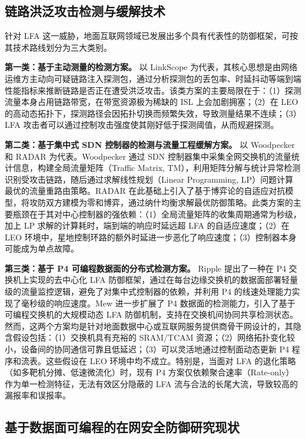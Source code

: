 \subsection{链路洪泛攻击检测与缓解技术}

针对 LFA 这一威胁，地面互联网领域已发展出多个具有代表性的防御框架，可按其技术路线划分为三大类别。

\textbf{第一类：基于主动测量的检测方案。} 以 LinkScope 为代表，其核心思想是由网络运维方主动向可疑链路注入探测包，通过分析探测包的丢包率、时延抖动等端到端性能指标来推断链路是否正在遭受洪泛攻击。该类方案的主要局限在于：（1）探测流量本身占用链路带宽，在带宽资源极为稀缺的 ISL 上会加剧拥塞；（2）在 LEO 的高动态拓扑下，探测路径会因拓扑切换而频繁失效，导致测量结果不连续；（3）LFA 攻击者可以通过控制攻击强度使其刚好低于探测阈值，从而规避探测。

\textbf{第二类：基于集中式 SDN 控制器的检测与流量工程缓解方案。} 以 Woodpecker 和 RADAR 为代表。Woodpecker 通过 SDN 控制器集中采集全网交换机的流量统计信息，构建全局流量矩阵（Traffic Matrix, TM），利用矩阵分解与统计异常检测识别受攻击链路，随后通过求解线性规划（Linear Programming, LP）问题计算最优的流量重路由策略。RADAR 在此基础上引入了基于博弈论的自适应对抗模型，将攻防双方建模为零和博弈，通过纳什均衡求解最优防御策略。此类方案的主要瓶颈在于其对中心控制器的强依赖：（1）全局流量矩阵的收集周期通常为秒级，加上 LP 求解的计算耗时，端到端的响应时延远超 LFA 的自适应速度；（2）在 LEO 环境中，星地控制环路的额外时延进一步恶化了响应速度；（3）控制器本身可能成为单点故障。

\textbf{第三类：基于 P4 可编程数据面的分布式检测方案。} Ripple 提出了一种在 P4 交换机上实现的去中心化 LFA 防御框架，通过在每台边缘交换机的数据面部署轻量级的流量监控逻辑，避免了对集中式控制器的依赖，并利用 P4 的线速处理能力实现了毫秒级的响应速度。Mew 进一步扩展了 P4 数据面的检测能力，引入了基于可编程交换机的大规模动态 LFA 防御机制，支持在交换机间协同共享检测状态。然而，这两个方案均是针对地面数据中心或互联网服务提供商骨干网设计的，其隐含假设包括：（1）交换机具有充裕的 SRAM/TCAM 资源；（2）网络拓扑变化较小，设备间的协同通信可靠且低延迟；（3）可以灵活地通过控制面动态更新 P4 程序和流表。这些假设在 LEO 环境中均不成立。特别是，当面对 LFA 的退化策略（如多靶机分摊、低速微流化）时，现有 P4 方案仅依赖聚合速率（Rate-only）作为单一检测特征，无法有效区分隐蔽的 LFA 流与合法的长尾大流，导致较高的漏报率和误报率。

\subsection{基于数据面可编程的在网安全防御研究现状}

